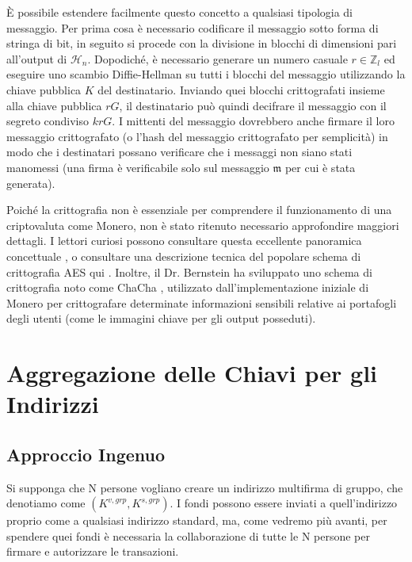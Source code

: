 È possibile estendere facilmente questo concetto a qualsiasi tipologia di messaggio. Per prima cosa è necessario codificare il messaggio sotto forma di stringa di bit, in seguito si procede con la divisione in blocchi di dimensioni pari all'output di $\mathcal{H}_n$. Dopodiché, è necessario generare un numero casuale $r \in \mathbb{Z}_l$ ed eseguire uno scambio Diffie-Hellman su tutti i blocchi del messaggio utilizzando la chiave pubblica $K$ del destinatario. Inviando quei blocchi crittografati insieme alla chiave pubblica $r G$, il destinatario può quindi decifrare il messaggio con il segreto condiviso $k r G$. I mittenti del messaggio dovrebbero anche firmare il loro messaggio crittografato (o l'hash del messaggio crittografato per semplicità) in modo che i destinatari possano verificare che i messaggi non siano stati manomessi (una firma è verificabile solo sul messaggio $\mathfrak{m}$ per cui è stata generata).

Poiché la crittografia non è essenziale per comprendere il funzionamento di una criptovaluta come Monero, non è stato ritenuto necessario approfondire maggiori dettagli. I lettori curiosi possono consultare questa eccellente panoramica concettuale \cite{tutorialspoint-cryptography}, o consultare una descrizione tecnica del popolare schema di crittografia AES qui \cite{AES-encryption}. Inoltre, il Dr. Bernstein ha sviluppato uno schema di crittografia noto come ChaCha \cite{Bernstein_chacha,chacha-irtf}, utilizzato dall'implementazione iniziale di Monero per crittografare determinate informazioni sensibili relative ai portafogli degli utenti (come le immagini chiave per gli output posseduti).



\section{Aggregazione delle Chiavi per gli Indirizzi}
\label{sec:key-aggregation}

\subsection{Approccio Ingenuo}
\label{sec:naive-key-aggregation}

Si supponga che N persone vogliano creare un indirizzo multifirma di gruppo, che denotiamo come $(K^{v,grp},K^{s,grp})$. I fondi possono essere inviati a quell'indirizzo proprio come a qualsiasi indirizzo standard, ma, come vedremo più avanti, per spendere quei fondi è necessaria la collaborazione di tutte le N persone per firmare e autorizzare le transazioni.

